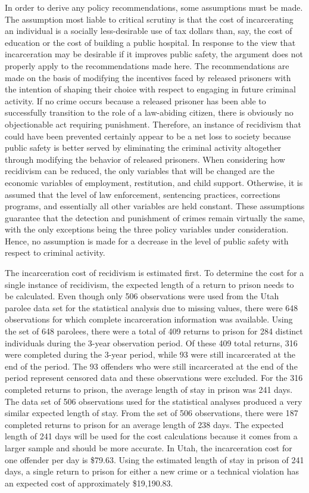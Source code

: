 In order to derive any policy recommendations, some assumptions must be made.  The assumption most liable to critical scrutiny is that the cost of incarcerating an individual is a socially less-desirable use of tax dollars than, say, the cost of education or the cost of building a public hospital.  In response to the view that incarceration may be desirable if it improves public safety, the argument does not properly apply to the recommendations made here.  The recommendations are made on the basis of modifying the incentives faced by released prisoners with the intention of shaping their choice with respect to engaging in future criminal activity.  If no crime occurs because a released prisoner has been able to successfully transition to the role of a law-abiding citizen, there is obviously no objectionable act requiring punishment.  Therefore, an instance of recidivism that could have been prevented certainly appear to be a net loss to society because public safety is better served by eliminating the criminal activity altogether through modifying the behavior of released prisoners.  When considering how recidivism can be reduced, the only variables that will be changed are the economic variables of employment, restitution, and child support.  Otherwise, it is assumed that the level of law enforcement, sentencing practices, corrections programs, and essentially all other variables are held constant.  These assumptions guarantee that the detection and punishment of crimes remain virtually the same, with the only exceptions being the three policy variables under consideration.  Hence, no assumption is made for a decrease in the level of public safety with respect to criminal activity.

The incarceration cost of recidivism is estimated first.  To determine the cost for a single instance of recidivism, the expected length of a return to prison needs to be calculated.  Even though only 506 observations were used from the Utah parolee data set for the statistical analysis due to missing values, there were 648 observations for which complete incarceration information was available.  Using the set of 648 parolees, there were a total of 409 returns to prison for 284 distinct individuals during the 3-year observation period.  Of these 409 total returns, 316 were completed during the 3-year period, while 93 were still incarcerated at the end of the period.  The 93 offenders who were still incarcerated at the end of the period represent censored data and these observations were excluded.  For the 316 completed returns to prison, the average length of stay in prison was 241 days.  The data set of 506 observations used for the statistical analyses produced a very similar expected length of stay.  From the set of 506 observations, there were 187 completed returns to prison for an average length of 238 days.  The expected length of 241 days will be used for the cost calculations because it comes from a larger sample and should be more accurate.  In Utah, the incarceration cost for one offender per day is \$79.63.  Using the estimated length of stay in prison of 241 days, a single return to prison for either a new crime or a technical violation has an expected cost of approximately \$19,190.83.

